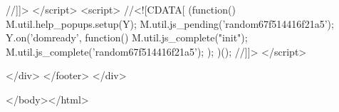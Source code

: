 //]]>
</script>
<script>
//<![CDATA[
(function() {M.util.help_popups.setup(Y);
 M.util.js_pending('random67f514416f21a5'); Y.on('domready', function() { M.util.js_complete("init");  M.util.js_complete('random67f514416f21a5'); });
})();
//]]>
</script>

        </div>
    </footer>
</div>


</body></html>